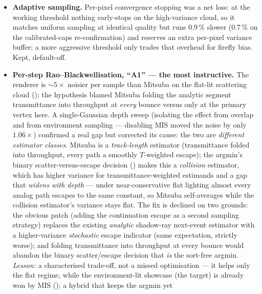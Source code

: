 \begin{itemize}
  root-caused a genuine silent-bias bug in the \emph{buffered} path (a $\chi\!\approx\!0$
  inverse-CDF undershoot that let the winning primitive be excluded from its own active set ---
  since fixed) and established empirically that OptiX does not report hits at exactly
  $t = t_{\max}$; both findings outlived the experiment.
  \item \textbf{Adaptive sampling.} Per-pixel convergence stopping was a net loss: at the
  working threshold nothing early-stops on the high-variance cloud, so it matches uniform sampling at
  identical quality but runs \num{0.9}\,\% slower (\num{0.7}\,\% on the calibrated-caps re-confirmation)
and reserves an extra per-pixel variance buffer; a
  more aggressive threshold only trades that overhead for firefly bias. Kept, default-off.
  \item \textbf{Per-step Rao--Blackwellisation, ``A1'' --- the most instructive.} The renderer
  is ${\sim}5\times$ noisier per sample than Mitsuba on the flat-lit scattering cloud
  (); the hypothesis blamed Mitsuba folding the analytic segment transmittance
  into throughput at \emph{every} bounce versus only at the primary vertex here. A single-Gaussian depth
  sweep (isolating the effect from overlap and from environment sampling --- disabling MIS moved the
  noise by only $1.06\times$) confirmed a real gap but corrected its cause: the two are \emph{different
  estimator classes}. Mitsuba is a \emph{track-length} estimator (transmittance folded into throughput,
  every path a smoothly $T$-weighted escape); the argmin's binary scatter-versus-escape decision
  () makes this a \emph{collision} estimator, which has higher variance for
  transmittance-weighted estimands and a gap that \emph{widens with depth} --- under near-conservative
  flat lighting almost every analog path escapes to the same constant, so Mitsuba self-averages while the
  collision estimator's variance stays flat. The fix is declined on two grounds: the obvious patch
  (adding the continuation escape as a second sampling strategy) replaces the existing \emph{analytic}
  shadow-ray next-event estimator with a higher-variance \emph{stochastic} escape indicator (same
  expectation, strictly worse); and folding transmittance into throughput at every bounce would abandon
  the binary scatter/escape decision that \emph{is} the sort-free argmin. \emph{Lesson:} a characterised
  trade-off, not a missed optimisation --- it helps only the flat regime, while the environment-lit
  showcase (the target) is already won by MIS (); a hybrid that keeps the argmin yet

\end{itemize}
